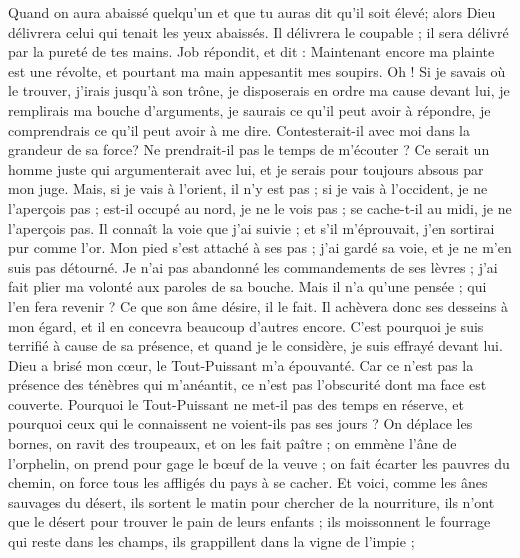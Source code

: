 \begin{multicols}{2}
Quand on aura abaissé quelqu'un et que tu auras dit qu'il soit élevé; alors Dieu délivrera celui qui tenait les yeux abaissés.
Il délivrera le coupable ; il sera délivré par la pureté de tes mains.
\VerseOne{}Job répondit, et dit :
Maintenant encore ma plainte est une révolte, et pourtant ma main appesantit mes soupirs.
Oh ! Si je savais où le trouver, j'irais jusqu'à son trône,
je disposerais en ordre ma cause devant lui, je remplirais ma bouche d'arguments,
je saurais ce qu'il peut avoir à répondre, je comprendrais ce qu'il peut avoir à me dire.
Contesterait-il avec moi dans la grandeur de sa force? Ne prendrait-il pas le temps de m'écouter ?
Ce serait un homme juste qui argumenterait avec lui, et je serais pour toujours absous par mon juge.
Mais, si je vais à l'orient, il n'y est pas ; si je vais à l'occident, je ne l'aperçois pas ;
est-il occupé au nord, je ne le vois pas ; se cache-t-il au midi, je ne l'aperçois pas.
Il connaît la voie que j'ai suivie ; et s'il m'éprouvait, j'en sortirai pur comme l'or.
Mon pied s'est attaché à ses pas ; j'ai gardé sa voie, et je ne m'en suis pas détourné.
Je n'ai pas abandonné les commandements de ses lèvres ; j'ai fait plier ma volonté aux paroles de sa bouche.
Mais il n'a qu'une pensée ; qui l'en fera revenir ? Ce que son âme désire, il le fait.
Il achèvera donc ses desseins à mon égard, et il en concevra beaucoup d'autres encore.
C'est pourquoi je suis terrifié à cause de sa présence, et quand je le considère, je suis effrayé devant lui.
Dieu a brisé mon cœur, le Tout-Puissant m'a épouvanté.
Car ce n'est pas la présence des ténèbres qui m'anéantit, ce n'est pas l'obscurité dont ma face est couverte.
\VerseOne{}Pourquoi le Tout-Puissant ne met-il pas des temps en réserve, et pourquoi ceux qui le connaissent ne voient-ils pas ses jours ?
On déplace les bornes, on ravit des troupeaux, et on les fait paître ;
on emmène l'âne de l'orphelin, on prend pour gage le bœuf de la veuve ;
on fait écarter les pauvres du chemin, on force tous les affligés du pays à se cacher.
Et voici, comme les ânes sauvages du désert, ils sortent le matin pour chercher de la nourriture, ils n'ont que le désert pour trouver le pain de leurs enfants ;
ils moissonnent le fourrage qui reste dans les champs, ils grappillent dans la vigne de l'impie ;

\end{multicols}
